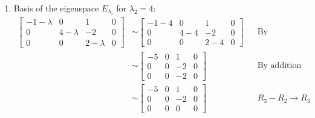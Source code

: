 \documentclass[10pt,letterpaper,final]{report}
\newcommand{\reason}[1]{&& \text{#1}}
\begin{document}
\begin{enumerate}[label=(\alph*)]
\begin{enumerate}[label=(\arabic*)]
                \pagebreak
          \item Basis of the eigenspace $E_{\lambda_i}$ for $\lambda_2 = 4$:
                \begin{align*}
                  \left[\begin{array}{rrr|r}
                      -1 - \lambda & 0           & 1           & 0 \\
                      0            & 4 - \lambda & -2          & 0 \\
                      0            & 0           & 2 - \lambda & 0
                    \end{array}\right] & \sim \left[\begin{array}{rrr|r}
                                                  -1 - 4 & 0     & 1     & 0 \\
                                                  0      & 4 - 4 & -2    & 0 \\
                                                  0      & 0     & 2 - 4 & 0
                                                \end{array}\right] \reason{By substitution}                                           \\[1ex]
                                                                      & \sim \left[\begin{array}{rrr|r}
                                                                                 -5 & 0 & 1  & 0 \\
                                                                                 0  & 0 & -2 & 0 \\
                                                                                 0  & 0 & -2 & 0
                                                                               \end{array}\right] \reason{By addition}                \\[1ex]
                                                                      & \sim \left[\begin{array}{rrr|r}
                                                                                 -5 & 0 & 1  & 0 \\
                                                                                 0  & 0 & -2 & 0 \\
                                                                                 0  & 0 & 0  & 0
                                                                               \end{array}\right] \reason{$R_3 - R_2 \to R_3 $}       \\[1ex]

\end{align*}
\end{enumerate}
\end{enumerate}
\end{document}
